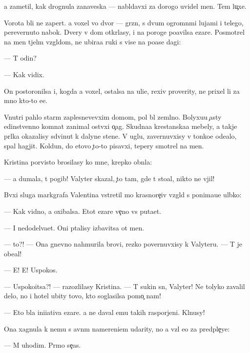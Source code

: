 \documentclass[10pt]{book}
\begin{document}
{\Y}a zametil, kak drognula zanaveska — nabl{\iu}davxi{\y} za dorogo{\y} uvidel men{\ia}. Tem lu{\c}xe.

Vorota b{\yi}li ne zapert{\yi}. {\Y}a voxel vo dvor — gr{\ia}zn{\yi}{\y}, s dvum{\ia} ogromn{\yi}mi lujami i telego{\y}, perevernuto{\y} nabok. Dvery v dom otkr{\yi}lasy, i na poroge po{\y}avilsa {\C}ezare. Posmotrel na men{\ia} t{\ia}jel{\yi}m vzgl{\ia}dom, ne ubira{\y}a ruki s vis{\ia}{\x}e{\y} na po{\y}ase dagi:

— T{\yi} odin?

— Kak vidix.

On postoronilsa i, kogda {\y}a voxel, ostalsa na uli{\q}e, rexiv proverity, ne prixel li za mno{\y} kto-to {\y}e{\x}e.

Vnutri pahlo star{\yi}m zaplesnevevxim domom, pol b{\yi}l zeml{\ia}no{\y}. Bolyxu{\y}u {\c}asty {\y}edinstvenno{\y} komnat{\yi} zanimal ost{\yi}vxi{\y} o{\c}ag. Skudna{\y}a krest{\y}anska{\y}a mebely, a takje pr{\ia}lka okazalisy sdvinut{\yi} k dalyne{\y} stene. V uglu, zavernuvxisy v tonko{\y}e ode{\y}alo, spal hagjit. Koldun, do etovo {\c}to-to pisavxi{\y}, tepery smotrel na men{\ia}.

Kristina por{\yi}visto brosilasy ko mne, krepko obn{\ia}la:

— {\Y}a dumala, t{\yi} pogib! Valyter skazal, {\c}to tam, gde t{\yi} sto{\y}al, nikto ne v{\yi}jil!

B{\yi}vxi{\y} sluga markgrafa Valentina vstretil mo{\y} krasnore{\c}iv{\yi}{\y} vzgl{\ia}d s ponima{\y}u{\x}e{\y} ul{\yi}bko{\y}:

— Kak vidno, {\y}a oxibalsa. Etot {\C}ezare ve{\c}no vs{\e} puta{\y}et.

— I nedodel{\yi}va{\y}et. Oni p{\yi}talisy izbavitsa ot men{\ia}.

— {\C}to?! — Ona gnevno nahmurila brovi, rezko povernuvxisy k Valyteru. — T{\yi} je obe{\x}al!

— E{\y}! E{\y}! Uspoko{\y}s{\ia}.

— Uspoko{\y}itsa?! — razozlilasy Kristina. — T{\yi} sukin s{\yi}n, Valyter! Ne tolyko zavalil delo, no i hotel ubity tovo, kto soglasilsa pomo{\c} nam!

— Eto b{\yi}la ini{\q}iativa {\C}ezare. {\Y}a ne daval {\y}emu takih raspor{\ia}jeni{\y}. Kl{\ia}nusy!

Ona xagnula k nemu s {\y}avn{\yi}m namereni{\y}em udarity, no {\y}a vz{\ia}l {\y}e{\y}o za predple{\c}ye:

— M{\yi} uhodim. Pr{\ia}mo se{\y}{\c}as.
\end{document}
